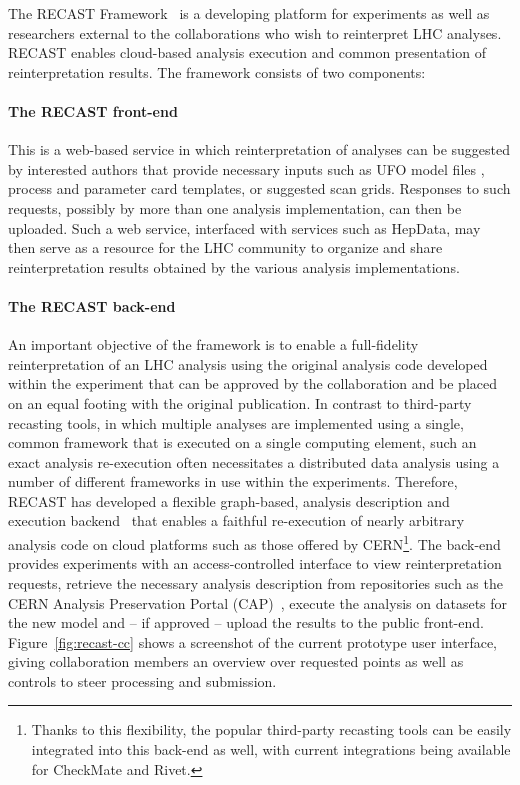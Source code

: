 The RECAST Framework~\cite{Cranmer:2010hk} is a developing platform for experiments as well as  researchers external to the collaborations who wish to reinterpret LHC analyses. RECAST enables cloud-based analysis execution and common presentation of reinterpretation results. The framework consists of two components:

\paragraph{The RECAST front-end} This is a web-based service in which reinterpretation of analyses can be suggested by interested authors that provide necessary inputs such as UFO model files \cite{Degrande:2011ua}, process and parameter card templates, or suggested scan grids. Responses to such requests, possibly by more than one analysis implementation, can then be uploaded. Such a web service, interfaced with services such as HepData, may then serve as a resource for the LHC community to organize and share reinterpretation results obtained by the various analysis implementations.

\paragraph{The RECAST back-end} An important objective of the framework is to enable a full-fidelity reinterpretation of an LHC analysis using the original analysis code developed within the experiment that can be approved by the collaboration and be placed on an equal footing with the original publication. In contrast to third-party recasting tools, in which multiple analyses are implemented using a single, common framework that is  executed on a single computing element, such an exact analysis re-execution often necessitates a distributed data analysis using a number of different frameworks in use within the experiments. Therefore, RECAST has developed a flexible graph-based, analysis description and execution backend~\cite{Heinrich:2297545} that enables a faithful re-execution of nearly arbitrary analysis code on cloud platforms such as those offered by CERN\footnote{Thanks to this flexibility, the popular third-party recasting tools can  be easily integrated into this back-end as well, with current integrations being available for CheckMate and Rivet.}. The back-end provides experiments with an access-controlled interface to view reinterpretation requests, retrieve the necessary analysis description from repositories such as the CERN Analysis Preservation Portal (CAP)~\cite{CAP},  execute the analysis on datasets for the new model and -- if approved -- upload the results to the public front-end. Figure~\ref{fig:recast-cc} shows a screenshot of the current prototype user interface, giving collaboration members an overview over requested points as well as controls to steer processing and submission.

